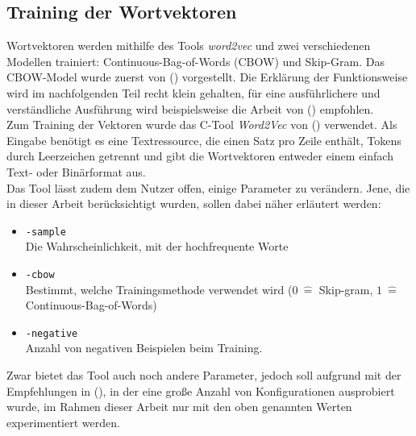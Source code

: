   \subsection{Training der Wortvektoren}

  Wortvektoren werden mithilfe des Tools \emph{word2vec} und zwei verschiedenen Modellen trainiert: Continuous-Bag-of-Words (CBOW)
  und Skip-Gram. Das CBOW-Model wurde zuerst von (\cite{mikolov2013efficient}) vorgestellt. Die Erklärung der Funktionsweise
  wird im nachfolgenden Teil recht klein gehalten, für eine ausführlichere und verständliche Ausführung wird beispielsweise
  die Arbeit von (\cite{rong2014word2vec}) empfohlen.\\

  Zum Training der Vektoren wurde das C-Tool \emph{Word2Vec} von (\citeauthor{mikolov2013efficient}) verwendet. Als Eingabe
  benötigt es eine Textressource, die einen Satz pro Zeile enthält, Tokens durch Leerzeichen getrennt und gibt die Wortvektoren
  entweder einem einfach Text- oder Binärformat aus.\\
  Das Tool lässt zudem dem Nutzer offen, einige Parameter zu verändern. Jene, die in dieser Arbeit berücksichtigt wurden, sollen
  dabei näher erläutert werden:
  \begin{itemize}
    \item \verb|-sample|\\Die Wahrscheinlichkeit, mit der hochfrequente Worte
    \item \verb|-cbow|\\Bestimmt, welche Trainingsmethode verwendet wird ($0\ \hat{=}$ Skip-gram, $1\ \hat{=}$ Continuous-Bag-of-Words)
    \item \verb|-negative|\\Anzahl von negativen Beispielen beim Training.
  \end{itemize}

  Zwar bietet das Tool auch noch andere Parameter, jedoch soll aufgrund mit der Empfehlungen in (\citeauthor{levy2015improving}), in
  der eine große Anzahl von Konfigurationen ausprobiert wurde, im Rahmen dieser Arbeit nur mit den oben genannten Werten experimentiert werden.

